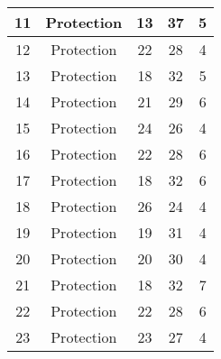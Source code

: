 \documentclass[results.tex]{subfiles}
\begin{document}
\begin{center}
\begin{tabular}{| c || c | c | c | c |}
            \hline
            11                      & Protection                   & 13                     & 37                      & 5                    \\
            \hline
            12                      & Protection                   & 22                     & 28                      & 4                    \\
            \hline
            13                      & Protection                   & 18                     & 32                      & 5                    \\
            \hline
            14                      & Protection                   & 21                     & 29                      & 6                    \\
            \hline
            15                      & Protection                   & 24                     & 26                      & 4                    \\
            \hline
            16                      & Protection                   & 22                     & 28                      & 6                    \\
            \hline
            17                      & Protection                   & 18                     & 32                      & 6                    \\
            \hline
            18                      & Protection                   & 26                     & 24                      & 4                    \\
            \hline
            19                      & Protection                   & 19                     & 31                      & 4                    \\
            \hline
            20                      & Protection                   & 20                     & 30                      & 4                    \\
            \hline
            21                      & Protection                   & 18                     & 32                      & 7                    \\
            \hline
            22                      & Protection                   & 22                     & 28                      & 6                    \\
            \hline
            23                      & Protection                   & 23                     & 27                      & 4                    \\

\end{tabular}
\end{center}
\end{document}
